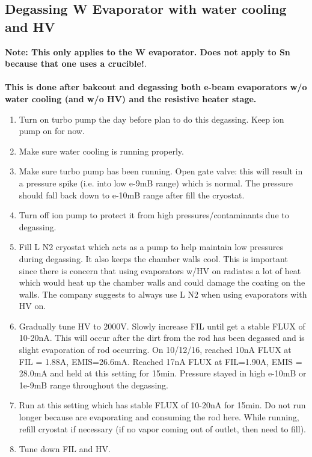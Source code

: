 \subsection{Degassing W Evaporator with water cooling and HV}
\textbf{Note: This only applies to the W evaporator. Does not apply to Sn because that one uses a crucible!}.\\\\
\textbf{This is done after bakeout and degassing both e-beam evaporators w/o water cooling (and w/o HV) and the resistive heater stage.}
\begin{enumerate}
\item	Turn on turbo pump the day before plan to do this degassing. Keep ion pump on for now.
\item	Make sure water cooling is running properly.
\item	Make sure turbo pump has been running. Open gate valve: this will result in a pressure spike (i.e. into low e-9mB range) which is normal. The pressure should fall back down to e-10mB range after fill the cryostat. 
\item	Turn off ion pump to protect it from high pressures/contaminants due to degassing.
\item	Fill L N2 cryostat which acts as a pump to help maintain low pressures during degassing. It also keeps the chamber walls cool. This is important since there is concern that using evaporators w/HV on radiates a lot of heat which would heat up the chamber walls and could damage the coating on the walls. The company suggests to always use L N2 when using evaporators with HV on.
\item	Gradually tune HV to 2000V. Slowly increase FIL until get a stable FLUX of 10-20nA. This will occur after the dirt from the rod has been degassed and is slight evaporation of rod occurring. 
On 10/12/16, reached 10nA FLUX at FIL = 1.88A, EMIS=26.6mA. Reached 17nA FLUX at FIL=1.90A, EMIS = 28.0mA and held at this setting for 15min. Pressure stayed in high e-10mB or 1e-9mB range throughout the degassing.
\item	Run at this setting which has stable FLUX of 10-20nA for 15min. Do not run longer because are evaporating and consuming the rod here. While running, refill cryostat if necessary (if no vapor coming out of outlet, then need to fill).
\item	Tune down FIL and HV.
\end{enumerate}

